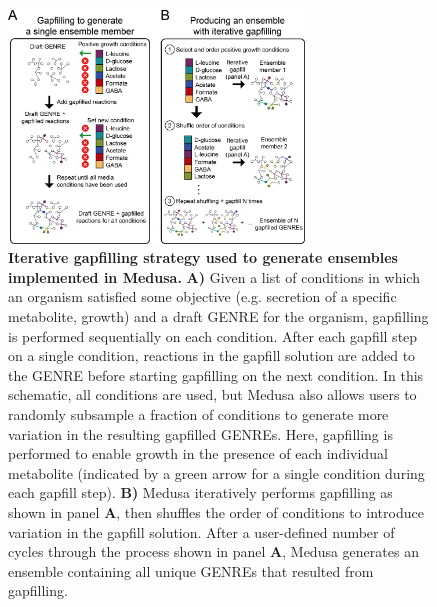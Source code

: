 \documentclass[11pt,onecolumn,notitlepage,openany,twoside]{book}
\begin{document}
\begin{refsection}
\begin{figure}[!tb]
\centering
\includegraphics[width=0.7\textwidth]{ch4_fig4}
\caption[ Iterative gapfilling strategy used to generate ensembles implemented in Medusa.]{\textbf{ Iterative gapfilling strategy used to generate ensembles implemented in Medusa.}  \textbf{A)} Given a list of conditions in which an organism satisfied some objective (e.g. secretion of a specific metabolite, growth) and a draft GENRE for the organism, gapfilling is performed sequentially on each condition. After each gapfill step on a single condition, reactions in the gapfill solution are added to the GENRE before starting gapfilling on the next condition. In this schematic, all conditions are used, but Medusa also allows users to randomly subsample a fraction of conditions to generate more variation in the resulting gapfilled GENREs. Here, gapfilling is performed to enable growth in the presence of each individual metabolite (indicated by a green arrow for a single condition during each gapfill step). \textbf{B)} Medusa iteratively performs gapfilling as shown in panel \textbf{A}, then shuffles the order of conditions to introduce variation in the gapfill solution. After a user-defined number of cycles through the process shown in panel \textbf{A}, Medusa generates an ensemble containing all unique GENREs that resulted from gapfilling.}
\end{figure}


\end{refsection}
\end{document}
